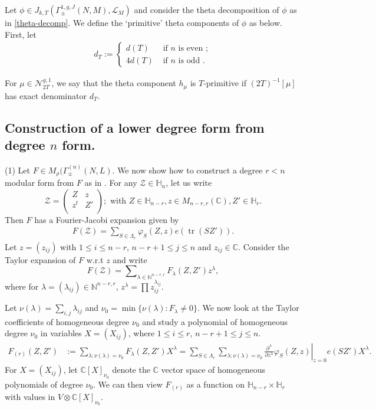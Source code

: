 \documentclass[11pt]{amsart}
\numberwithin{equation}{section}
\newcommand{\mbb}{\mathbb}
\newcommand{\mc}{\mathcal}
\newcommand{\smat}[4]{\left( \begin{smallmatrix} #1 & #2 \\ #3 & #4 \\ \end{smallmatrix} \right)}
\DeclareMathOperator{\tr}{tr}
\newcommand{\sumn}{\sum \nolimits}
\newcommand{\Mrho}[2]{M_\rho(\Gamma_\pm^{(#1)}(#2, L)}
\begin{document}
Let $\phi \in J_{k,T}(\Gamma_\pm^{1,g,J}(N,M), \mc L_M)$ and consider the theta decomposition of $\phi$ as in \eqref{theta-decomp}. We define the `primitive' theta components of $\phi$ as below. First, let
\begin{align}\label{def:d_T}
d_T:=   \begin{cases}
        d(T) & \text{ if   }  n  \text{ is even }; \\
        4 d(T) & \text{ if   } n \text{ is odd }.
    \end{cases}
\end{align}

\begin{definition} \label{prelim:prim}
   For $ \mu\in \mc N_{2T}^{g,1}$, we say that the theta component $h_\mu$ is $T$-primitive if $(2T)^{-1}[\mu]$ has exact denominator  $d_T$.
\end{definition}


\subsection{Construction of a lower degree form from degree \texorpdfstring{$n$}{n} form.} \label{sec:Fcirc}

(1) Let $F\in \Mrho{n}{N}$. We now show how to construct a degree $r<n$ modular form from $F$ as in \cite{boche-das}. For any $\mc Z\in \mbb H_n$, let us write
\begin{equation}
    \mc Z=\smat{Z}{ z}{z^t}{Z'}; \text{ with } Z\in \mbb H_{n-r}, z\in M_{n-r,r}(\mbb C), Z'\in \mbb H_{r}.
\end{equation}
Then $F$ has a Fourier-Jacobi expansion given by
\begin{align}
    F(\mc Z)=\sumn_{S\in \Lambda_{r}} \varphi_S(Z, z) e(\tr(SZ')).
\end{align}
Let $z=(z_{ij})$ with $1\le i\le n-r$, $n-r+1\le j\le n$ and $z_{ij}\in \mbb C$. Consider the Taylor expansion of $F$ w.r.t $z$ and write
\begin{equation}
    F(\mc Z)= \sumn_{\lambda\in \mbb N^{n-r,r}} F_{\lambda}(Z, Z') z^\lambda,
\end{equation}
where for $\lambda=(\lambda_{ij})\in \mbb N^{n-r, r}$, $z^\lambda=\prod z_{ij}^{\lambda_{ij}}$.

Let $\nu(\lambda)=\sum_{i, j} \lambda_{ij}$ and $\nu_0=\min \{\nu(\lambda): F_\lambda\neq 0\}$. We now look at the Taylor coefficients of homogeneous degree $\nu_0$ and study a
polynomial of homogeneous degree $\nu_0$ in variables $X=(X_{ij})$, where $1\le i \le r$, $n-r+1\le j\le n$. 
\begin{align}
    F_{(r)}(Z, Z')&:= \sum_{\lambda: \nu(\lambda)=\nu_0} F_{\lambda}(Z, Z') X^\lambda= \sum_{S\in \Lambda_{r}} \sum_{\lambda: \nu(\lambda)=\nu_0} \left.\frac{\partial^\lambda}{\partial z^\lambda}\varphi_S(Z, z)\right |_{z=0} e(SZ') X^\lambda.
\end{align}
For $X=(X_{ij})$, let $\mbb C[X]_{\nu_0}$ denote the $\mbb C$ vector space of homogeneous polynomials of degree $\nu_0$. We can then view  $F_{(r)}$ as a function on $\mbb H_{n-r} \times \mbb H_r$ with values in $V\otimes \mbb C[X]_{\nu_0}$.
\end{document}

